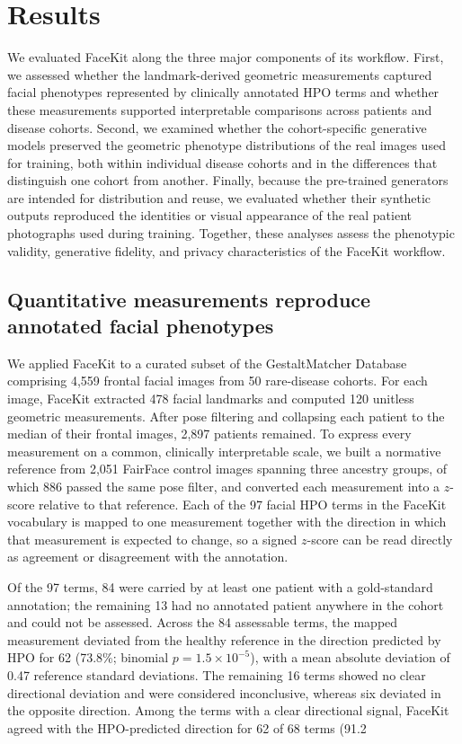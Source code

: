 \documentclass[11pt]{article}
\begin{document}
\section{Results}

We evaluated FaceKit along the three major components of its workflow. First, we assessed whether the landmark-derived geometric measurements captured facial phenotypes represented by clinically annotated HPO terms and whether these measurements supported interpretable comparisons across patients and disease cohorts. Second, we examined whether the cohort-specific generative models preserved the geometric phenotype distributions of the real images used for training, both within individual disease cohorts and in the differences that distinguish one cohort from another. Finally, because the pre-trained generators are intended for distribution and reuse, we evaluated whether their synthetic outputs reproduced the identities or visual appearance of the real patient photographs used during training. Together, these analyses assess the phenotypic validity, generative fidelity, and privacy characteristics of the FaceKit workflow.

\subsection{Quantitative measurements reproduce annotated facial phenotypes}

We applied FaceKit to a curated subset of the GestaltMatcher Database comprising
4,559 frontal facial images from 50 rare-disease cohorts. For each image, FaceKit
extracted 478 facial landmarks and computed 120 unitless geometric measurements.
After pose filtering and collapsing each patient to the median of their frontal
images, 2,897 patients remained. To express every measurement on a common,
clinically interpretable scale, we built a normative reference from 2,051 FairFace
control images spanning three ancestry groups, of which 886 passed the same pose
filter, and converted each measurement into a $z$-score relative to that reference.
Each of the 97 facial HPO terms in the FaceKit vocabulary is mapped to one
measurement together with the direction in which that measurement is expected to
change, so a signed $z$-score can be read directly as agreement or disagreement
with the annotation.

Of the 97 terms, 84 were carried by at least one patient with a gold-standard
annotation; the remaining 13 had no annotated patient anywhere in the cohort and
could not be assessed. Across the 84 assessable terms, the mapped measurement
deviated from the healthy reference in the direction predicted by HPO for 62
(73.8\%; binomial $p=1.5\times10^{-5}$), with a mean absolute deviation of 0.47
reference standard deviations. The remaining 16 terms showed no clear directional deviation and were considered inconclusive, whereas six deviated in the opposite direction. Among the terms with a clear directional signal, FaceKit agreed with the HPO-predicted direction for 62 of 68 terms (91.2%
\end{document}
